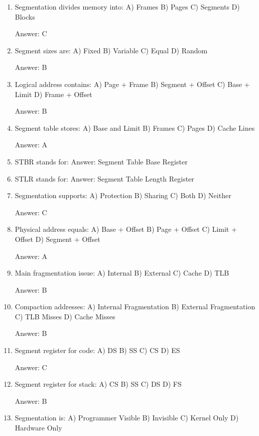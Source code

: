 \begin{enumerate}
\item Segmentation divides memory into:
A) Frames
B) Pages
C) Segments
D) Blocks

Answer: C

\item Segment sizes are:
A) Fixed
B) Variable
C) Equal
D) Random

Answer: B

\item Logical address contains:
A) Page + Frame
B) Segment + Offset
C) Base + Limit
D) Frame + Offset

Answer: B

\item Segment table stores:
A) Base and Limit
B) Frames
C) Pages
D) Cache Lines

Answer: A

\item STBR stands for:
Answer: Segment Table Base Register

\item STLR stands for:
Answer: Segment Table Length Register

\item Segmentation supports:
A) Protection
B) Sharing
C) Both
D) Neither

Answer: C

\item Physical address equals:
A) Base + Offset
B) Page + Offset
C) Limit + Offset
D) Segment + Offset

Answer: A

\item Main fragmentation issue:
A) Internal
B) External
C) Cache
D) TLB

Answer: B

\item Compaction addresses:
A) Internal Fragmentation
B) External Fragmentation
C) TLB Misses
D) Cache Misses

Answer: B

\item Segment register for code:
A) DS
B) SS
C) CS
D) ES

Answer: C

\item Segment register for stack:
A) CS
B) SS
C) DS
D) FS

Answer: B

\item Segmentation is:
A) Programmer Visible
B) Invisible
C) Kernel Only
D) Hardware Only


\end{enumerate}
